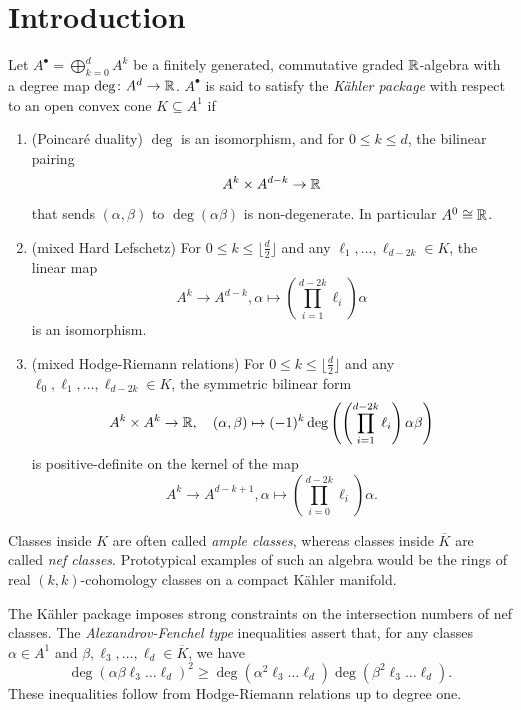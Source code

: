 \section{Introduction}\label{sec: introduction}

Let $A^\bullet=\bigoplus_{k=0}^dA^k$ be a finitely generated, commutative graded $\mathbb{R}$-algebra with a degree map $\deg\colon A^d\to \mathbb{R}$. $A^\bullet$ is said to satisfy the \textit{K\"ahler package} with respect to an open convex cone $K\subseteq A^1$ if
\begin{enumerate}
\item (Poincar\'e duality) $\deg$ is an isomorphism, and  for $0\leq k\leq d$, the bilinear pairing\[ A^{k}\times A^{d-k}\to\mathbb{R}\]that sends $(\alpha,\beta)$ to $\deg(\alpha\beta)$ is non-degenerate. In particular $A^0\cong \mathbb{R}$.
\item (mixed Hard Lefschetz) For $0\leq k\leq \lfloor\frac{d}{2}\rfloor$ and any $\ell_1,\ldots,\ell_{d-2k}\in K$, the linear map \[A^k\to A^{d-k},\alpha\mapsto \left(\prod_{i=1}^{d-2k}\ell_i\right)\alpha\]is an isomorphism.
\item (mixed Hodge-Riemann relations) For $0\leq k\leq \lfloor\frac{d}{2}\rfloor$ and any $\ell_0,\ell_1,\ldots,\ell_{d-2k}\in K$, the symmetric bilinear form \[A^k\times A^k\to \mathbb{R},\quad (\alpha,\beta)\mapsto(-1)^k \deg\left(\left(\prod_{i=1}^{d-2k}\ell_i\right)\alpha\beta\right)\]is positive-definite on the kernel of the map\[A^k\to A^{d-k+1},\alpha\mapsto \left(\prod_{i=0}^{d-2k}\ell_i\right)\alpha.\]
\end{enumerate}
Classes inside $K$ are often called \textit{ample classes}, whereas classes inside $\overline K$ are called \textit{nef classes}. Prototypical examples of such an algebra would be the rings of real $(k,k)$-cohomology classes on a compact K\"ahler manifold.

The K\"ahler package imposes strong constraints on the intersection numbers of nef classes. The \textit{Alexandrov-Fenchel type} inequalities assert that,
for any classes $\alpha\in A^1$ and $\beta,\ell_3,\ldots,\ell_d\in \overline K$, we have \[
    \deg(\alpha\beta\ell_3\ldots\ell_d)^2\geq\deg(\alpha^2\ell_3\ldots\ell_d)\deg(\beta^2\ell_3\ldots\ell_d).
\]
These inequalities follow from Hodge-Riemann relations up to degree one.

